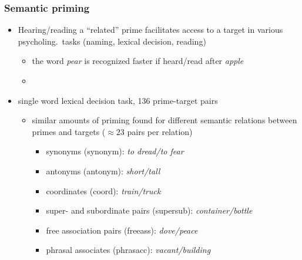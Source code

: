 \documentclass[t]{beamer} %
\begin{document}
\begin{frame}
  \frametitle{Semantic priming}
  \begin{itemize}
  \item Hearing/reading a ``related'' prime facilitates access to a
    target in various psycholing.\ tasks (naming, lexical decision,
    reading)
    \begin{itemize}
  \item the word \emph{pear} is recognized faster if heard/read after \emph{apple}
  \item[]
    \end{itemize}
  \item<2-> \citet{Hodgson:91} single word lexical decision task, 136
    prime-target pairs \citep[cf.][]{Pado:Lapata:07}
    \begin{itemize}
  \item similar amounts of priming found for different  semantic relations between primes and targets ($\approx 23$ pairs
    per relation)
    \begin{itemize}
    \item synonyms (synonym): \emph{to dread/to fear}
    \item antonyms (antonym): \emph{short/tall}
    \item coordinates (coord): \emph{train/truck}
    \item super- and subordinate pairs (supersub): \emph{container/bottle}
    \item free association pairs (freeass): \emph{dove/peace}
    \item phrasal associates (phrasacc): \emph{vacant/building}
    \end{itemize}
  \end{itemize}
\end{itemize}
\end{frame}
\end{document}
